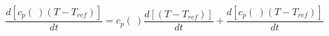 \begin{equation}
\frac{d [c_p(\ ) (T- T_{ref})]}{dt} =c_p(\ ) \frac{d [ (T- T_{ref})]}{dt} + \frac{d [c_p(\ ) (T- T_{ref})]}{dt}
\end{equation}